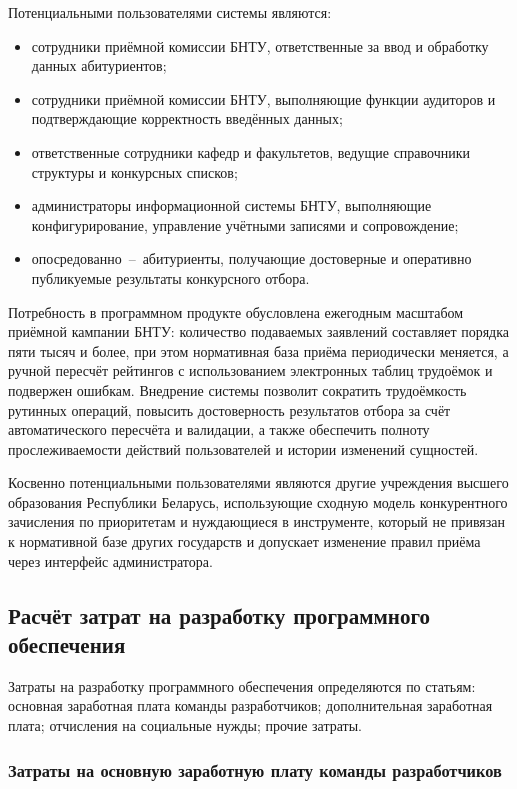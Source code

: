 Потенциальными пользователями системы являются:
\begin{itemize}
\item сотрудники приёмной комиссии БНТУ, ответственные за ввод и обработку данных абитуриентов;
\item сотрудники приёмной комиссии БНТУ, выполняющие функции аудиторов и подтверждающие корректность введённых данных;
\item ответственные сотрудники кафедр и факультетов, ведущие справочники структуры и конкурсных списков;
\item администраторы информационной системы БНТУ, выполняющие конфигурирование, управление учётными записями и сопровождение;
\item опосредованно~--~абитуриенты, получающие достоверные и оперативно публикуемые результаты конкурсного отбора.
\end{itemize}

Потребность в программном продукте обусловлена ежегодным масштабом приёмной кампании БНТУ: количество подаваемых заявлений составляет порядка пяти тысяч и более, при этом нормативная база приёма периодически меняется, а ручной пересчёт рейтингов с использованием электронных таблиц трудоёмок и подвержен ошибкам.
Внедрение системы позволит сократить трудоёмкость рутинных операций, повысить достоверность результатов отбора за счёт автоматического пересчёта и валидации, а также обеспечить полноту прослеживаемости действий пользователей и истории изменений сущностей.

Косвенно потенциальными пользователями являются другие учреждения высшего образования Республики Беларусь, использующие сходную модель конкурентного зачисления по приоритетам и нуждающиеся в инструменте, который не привязан к нормативной базе других государств и допускает изменение правил приёма через интерфейс администратора.

\subsection{Расчёт затрат на разработку программного обеспечения}

Затраты на разработку программного обеспечения определяются по статьям: основная заработная плата команды разработчиков; дополнительная заработная плата; отчисления на социальные нужды; прочие затраты.

\subsubsection{Затраты на основную заработную плату команды разработчиков}

